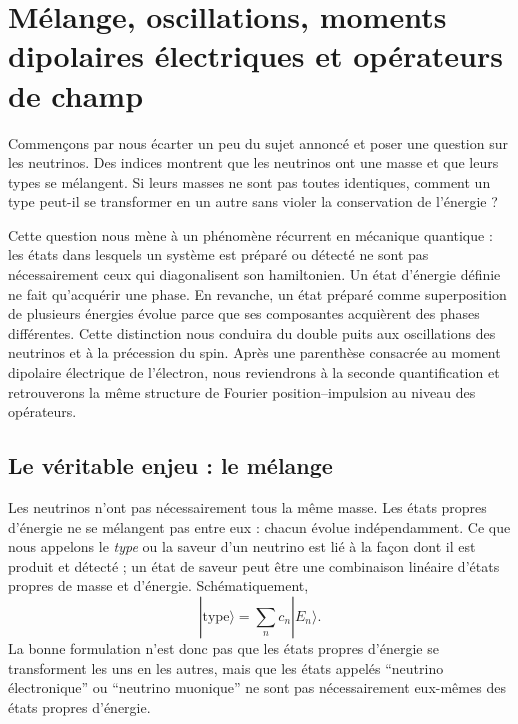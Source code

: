 \chapter{Mélange, oscillations, moments dipolaires électriques et opérateurs de champ}

Commençons par nous écarter un peu du sujet annoncé et poser une question sur les neutrinos. Des indices montrent que les neutrinos ont une masse et que leurs types se mélangent. Si leurs masses ne sont pas toutes identiques, comment un type peut-il se transformer en un autre sans violer la conservation de l’énergie ?

Cette question nous mène à un phénomène récurrent en mécanique quantique : les états dans lesquels un système est préparé ou détecté ne sont pas nécessairement ceux qui diagonalisent son hamiltonien. Un état d’énergie définie ne fait qu’acquérir une phase. En revanche, un état préparé comme superposition de plusieurs énergies évolue parce que ses composantes acquièrent des phases différentes. Cette distinction nous conduira du double puits aux oscillations des neutrinos et à la précession du spin. Après une parenthèse consacrée au moment dipolaire électrique de l’électron, nous reviendrons à la seconde quantification et retrouverons la même structure de Fourier position--impulsion au niveau des opérateurs.

\section{Le véritable enjeu : le mélange}

Les neutrinos n’ont pas nécessairement tous la même masse. Les états propres d’énergie ne se mélangent pas entre eux : chacun évolue indépendamment. Ce que nous appelons le \emph{type} ou la saveur d’un neutrino est lié à la façon dont il est produit et détecté ; un état de saveur peut être une combinaison linéaire d’états propres de masse et d’énergie. Schématiquement, \begin{equation}
|\text{type}\rangle = \sum_n c_n |E_n\rangle .
\end{equation}La bonne formulation n’est donc pas que les états propres d’énergie se transforment les uns en les autres, mais que les états appelés ``neutrino électronique'' ou ``neutrino muonique'' ne sont pas nécessairement eux-mêmes des états propres d’énergie.

\begin{classroomqa}\end{classroomqa}

